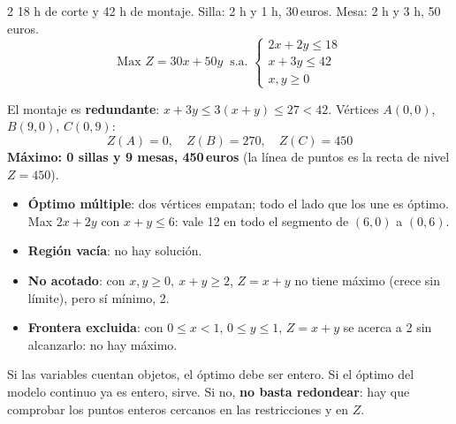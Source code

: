 \documentclass[10pt]{article}
\begin{document}
\begin{multicols}{2}
18 h de corte y 42 h de montaje. Silla: 2 h y 1 h, 30\,euros. Mesa: 2 h y 3 h, 50\,euros.
\[\text{Max }Z=30x+50y\ \text{ s.a. }\begin{cases}2x+2y\le18\\x+3y\le42\\x,y\ge0\end{cases}\]
\begin{center}
\end{center}
El montaje es \textbf{redundante}: \(x+3y\le3(x+y)\le27<42\). Vértices \(A(0,0)\), \(B(9,0)\), \(C(0,9)\):
\[Z(A)=0,\quad Z(B)=270,\quad Z(C)=450\]
\textbf{Máximo: 0 sillas y 9 mesas, 450\,euros} (la línea de puntos es la recta de nivel \(Z=450\)).

\begin{itemize}
  \item \textbf{Óptimo múltiple}: dos vértices empatan; todo el lado que los une es óptimo. Max \(2x+2y\) con \(x+y\le6\): vale 12 en todo el segmento de \((6,0)\) a \((0,6)\).
  \item \textbf{Región vacía}: no hay solución.
  \item \textbf{No acotado}: con \(x,y\ge0,\ x+y\ge2\), \(Z=x+y\) no tiene máximo (crece sin límite), pero sí mínimo, 2.
  \item \textbf{Frontera excluida}: con \(0\le x<1\), \(0\le y\le1\), \(Z=x+y\) se acerca a 2 sin alcanzarlo: no hay máximo.
\end{itemize}

Si las variables cuentan objetos, el óptimo debe ser entero. Si el óptimo del modelo continuo ya es entero, sirve. Si no, \textbf{no basta redondear}: hay que comprobar los puntos enteros cercanos en las restricciones y en \(Z\).


\end{multicols}
\end{document}
